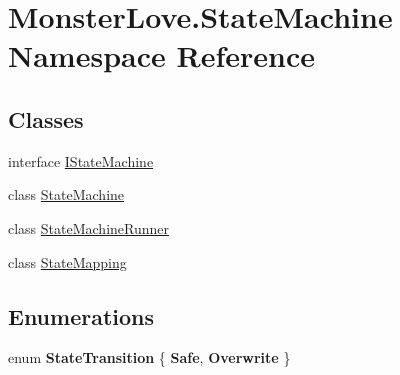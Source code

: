 \hypertarget{namespace_monster_love_1_1_state_machine}{}\section{Monster\+Love.\+State\+Machine Namespace Reference}
\label{namespace_monster_love_1_1_state_machine}
\subsection*{Classes}
\begin{DoxyCompactItemize}
\item 
interface \hyperlink{interface_monster_love_1_1_state_machine_1_1_i_state_machine}{I\+State\+Machine}
\item 
class \hyperlink{class_monster_love_1_1_state_machine_1_1_state_machine}{State\+Machine}
\item 
class \hyperlink{class_monster_love_1_1_state_machine_1_1_state_machine_runner}{State\+Machine\+Runner}
\item 
class \hyperlink{class_monster_love_1_1_state_machine_1_1_state_mapping}{State\+Mapping}
\end{DoxyCompactItemize}
\subsection*{Enumerations}
\begin{DoxyCompactItemize}
\item 
enum {\bfseries State\+Transition} \{ {\bfseries Safe}, 
{\bfseries Overwrite}
 \}\hypertarget{namespace_monster_love_1_1_state_machine_a0291c8253be1d8410a5b7467c5a8d883}{}\label{namespace_monster_love_1_1_state_machine_a0291c8253be1d8410a5b7467c5a8d883}

\end{DoxyCompactItemize}
